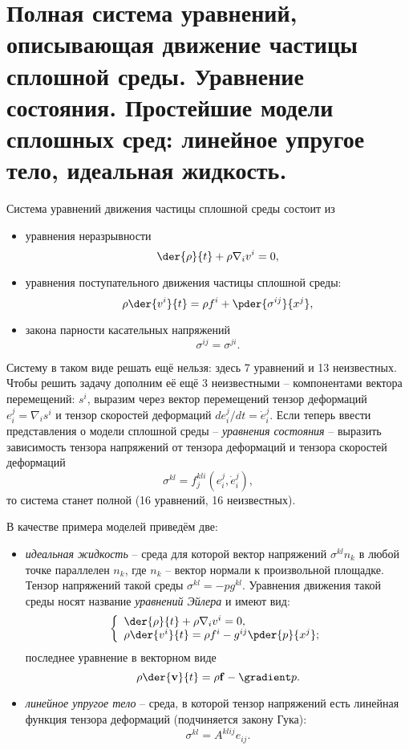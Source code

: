 \chapter{Полная система уравнений, описывающая движение частицы сплошной
среды. Уравнение состояния. Простейшие модели сплошных сред: линейное
упругое тело, идеальная жидкость.}

Система уравнений движения частицы сплошной среды состоит из
\begin{itemize}
\item уравнения неразрывности
\[
    \der{\rho }{t}+ \rho {\nabla_iv^i } = 0,
\]
\item уравнения поступательного движения частицы сплошной среды:
\[
    \rho  \der{v^i}{t}  = \rho f^i + \pder{ \sigma^{ij}}{x^j},
\]
\item закона парности касательных напряжений
\[
    \sigma^{ij} = \sigma^{ji}.
\]
\end{itemize}

Систему в таком виде решать ещё нельзя: здесь 7 уравнений и 13 неизвестных.
Чтобы решить задачу дополним её ещё 3 неизвестными -- компонентами вектора
перемещений: \( s^{i} \), выразим через вектор перемещений тензор деформаций
\( e^j_i  = \nabla_i s^i \) и тензор скоростей деформаций
\( {de^j_i}/{dt} = \dot{e}^j_i \). Если теперь ввести представления о модели
сплошной среды -- \emph{уравнения состояния} -- выразить зависимость тензора
напряжений от тензора деформаций и тензора скоростей деформаций
\[
    \sigma^{kl} = f^{kli}_j(e^j_i, \dot{e}^j_i),
\]
то система станет полной (16 уравнений, 16 неизвестных).

В качестве примера моделей приведём две:
\begin{itemize}
\item \emph{идеальная жидкость} -- среда для которой вектор напряжений
\( \sigma^{kl}n_k \) в любой точке параллелен \( n_k \), где \( n_k \) -- вектор
нормали к произвольной площадке. Тензор напряжений такой среды 
\( \sigma^{kl} = - p g^{kl} \). Уравнения движения такой среды носят название
\emph{уравнений Эйлера} и имеют вид:
\[
    \left\{\begin{array}{l}
    \der{\rho}{t} + \rho {\nabla_iv^i } = 0, \\
    \rho\der{v^i}{t}  = \rho f^i - g^{ij}\pder{p}{x^j};
    \end{array}\right.    
\]
последнее уравнение в векторном виде
\[
    \rho\der{\vec{v}}{t} = \rho\vec{f} - \gradient p.
\]

\item \emph{линейное упругое тело} -- среда, в которой тензор напряжений есть
линейная функция тензора деформаций (подчиняется закону Гука):
\[
    \sigma^{kl} = A^{klij}e_{ij}.
\]
\end{itemize}

\newpage
